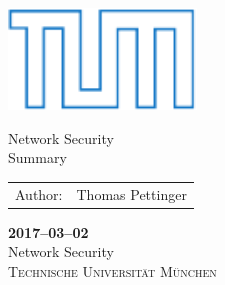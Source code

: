 \documentclass{article}
\begin{document}
\setcounter{tocdepth}{2} %


\begin{titlepage}
  \centering\includegraphics[width=5cm]{figures/tumlogo}

  \vspace{2.5cm}
  \Huge{Network Security} \\
  \vspace{0.1in}\huge{Summary}\\

  \Large
  \vspace{1.5cm}
  \begin{tabularx}{9cm}{r l}
    Author: & Thomas Pettinger\\
  \end{tabularx}

  \vfill
  \textbf{2017--03--02} \\
  \vspace{0.3in}\normalsize{Network Security}\\
  \vspace{0.03in}\normalsize{\textsc{Technische Universität München}}\\
  \vspace{1cm}

\end{titlepage}


\newpage
\thispagestyle{empty}
\tableofcontents

\newpage
{}


\newpage


\newpage


\newpage


\newpage


\newpage

\end{document}
